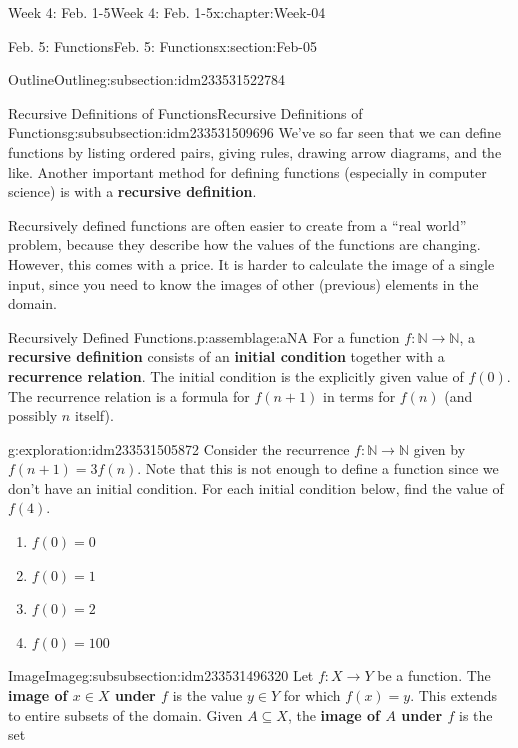 \documentclass[oneside,10pt,]{book}
\newcommand{\terminology}[1]{\textbf{#1}}
\numberwithin{equation}{section}
\def\N{{\mathbb N}}
\newcommand{\N}{\mathbb N}
\begin{document}
\begin{chapterptx}{Week 4: Feb. 1-5}{}{Week 4: Feb. 1-5}{}{}{x:chapter:Week-04}
\begin{sectionptx}{Feb. 5: Functions}{}{Feb. 5: Functions}{}{}{x:section:Feb-05}
\begin{subsectionptx}{Outline}{}{Outline}{}{}{g:subsection:idm233531522784}
\typeout{************************************************}
%
\begin{subsubsectionptx}{Recursive Definitions of Functions}{}{Recursive Definitions of Functions}{}{}{g:subsubsection:idm233531509696}
We've so far seen that we can define functions by listing ordered pairs, giving rules, drawing arrow diagrams, and the like. Another important method for defining functions (especially in computer science) is with a \terminology{recursive definition}.%
\par
Recursively defined functions are often easier to create from a ``real world'' problem, because they describe how the values of the functions are changing. However, this comes with a price. It is harder to calculate the image of a single input, since you need to know the images of other (previous) elements in the domain.%
\begin{assemblage}{Recursively Defined Functions.}{p:assemblage:aNA}%
 For a function \(f:\N \to \N\), a \terminology{recursive definition} consists of an \terminology{initial condition} together with a \terminology{recurrence relation}. The initial condition is the explicitly given value of \(f(0)\). The recurrence relation is a formula for \(f(n+1)\) in terms for \(f(n)\) (and possibly \(n\) itself).%
\end{assemblage}
\begin{exploration}{}{g:exploration:idm233531505872}%
Consider the recurrence \(f : \N\to\N\) given by \(f(n+1) = 3f(n)\). Note that this is not enough to define a function since we don't have an initial condition. For each initial condition below, find the value of \(f(4)\).%
%
\begin{enumerate}
\item{}\(\displaystyle f(0)=0\)%
\item{}\(\displaystyle f(0)=1\)%
\item{}\(\displaystyle f(0)=2\)%
\item{}\(\displaystyle f(0)=100\)%
\end{enumerate}
\end{exploration}%
\end{subsubsectionptx}
%
%
\typeout{************************************************}
\typeout{************************************************}
%
\begin{subsubsectionptx}{Image}{}{Image}{}{}{g:subsubsection:idm233531496320}
Let \(f : X\to Y\) be a function. The \terminology{image of \(x\in X\) under \(f\)} is the value \(y\in Y\) for which \(f(x) = y\). This extends to entire subsets of the domain. Given \(A\subseteq X\), the \terminology{image of \(A\) under \(f\)} is the set%

\end{subsubsectionptx}
\end{subsectionptx}
\end{sectionptx}
\end{chapterptx}
\end{document}

